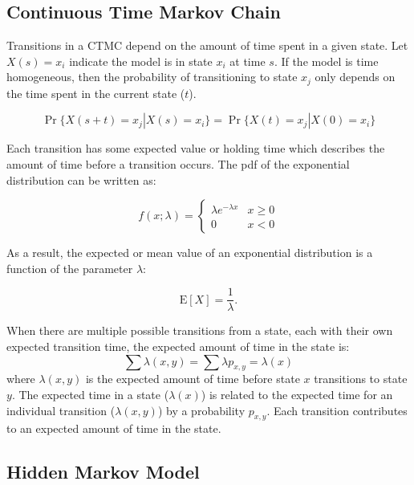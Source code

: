 \subsection{Continuous Time Markov Chain}

Transitions in a \ac{CTMC} depend on the amount of time spent in a given state.
Let $X(s) = x_i$ indicate the model is in state $x_i$ at time $s$.
If the model is time homogeneous, then the probability of transitioning to state $x_j$ only depends on the time spent in the current state ($t$).

\begin{equation}
    \Pr\{ X(s+t)=x_j | X(s) = x_i \} = \Pr\{ X(t)=x_j | X(0) = x_i \}
\end{equation}

Each transition has some expected value or holding time which describes the amount of time before a transition occurs.
The \ac{pdf} of the exponential distribution can be written as: \cite{MARKOV1}

\begin{equation}
f(x;\lambda) = \begin{cases}
\lambda e^{-\lambda x} & x \ge 0 \\
0 & x < 0
\end{cases}
\end{equation}

As a result, the expected or mean value of an exponential distribution is a function of the parameter $\lambda$: \cite{MARKOV1}

\begin{equation}
\mathrm{E}[X] = \frac{1}{\lambda}. \!
\end{equation}

When there are multiple possible transitions from a state, each with their own expected transition time, the expected amount of time in the state is: \cite{MARKOV2}
\begin{equation}
\sum \lambda(x,y) = \sum \lambda p_{x,y} = \lambda(x)
\end{equation}
where $\lambda(x,y)$ is the expected amount of time before state $x$ transitions to state $y$.
The expected time in a state ($\lambda(x)$) is related to the expected time for an individual transition ($\lambda(x,y)$) by a probability $p_{x,y}$.
Each transition contributes to an expected amount of time in the state.

\subsection{Hidden Markov Model}

